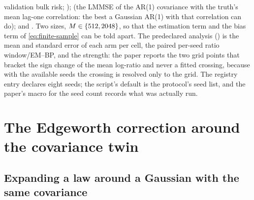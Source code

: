 validation bulk risk; );  (the LMMSE of the
AR(1) covariance with the truth's mean lag-one correlation: the best a Gaussian AR(1)
with that correlation can do); and . Two sizes, $M\in\{512,2048\}$, so
that the estimation term and the bias term of \cref{eq:finite-sample} can be told apart.
The predeclared analysis () is the mean and standard
error of each arm per cell, the paired per-seed ratio window/EM--BP, and the
 strength: the paper reports the two grid points that bracket the
sign change of the mean log-ratio and never a fitted crossing, because with the
available seeds the crossing is resolved only to the grid. The registry entry declares
eight seeds; the script's default is the protocol's seed list, and the paper's macro for
the seed count records what was actually run.

\section{The Edgeworth correction around the covariance twin}
\label{sec:edgeworth}

\subsection{Expanding a law around a Gaussian with the same covariance}

